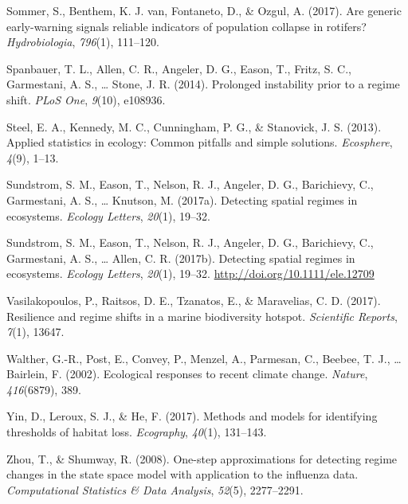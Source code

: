 \documentclass[12pt,twoside,openany]{reedthesis}
\begin{document}
\hypertarget{ref-sommer2017generic}{}
Sommer, S., Benthem, K. J. van, Fontaneto, D., \& Ozgul, A. (2017). Are
generic early-warning signals reliable indicators of population collapse
in rotifers? \emph{Hydrobiologia}, \emph{796}(1), 111--120.

\hypertarget{ref-spanbauer_prolonged_2014}{}
Spanbauer, T. L., Allen, C. R., Angeler, D. G., Eason, T., Fritz, S. C.,
Garmestani, A. S., \ldots{} Stone, J. R. (2014). Prolonged instability
prior to a regime shift. \emph{PLoS One}, \emph{9}(10), e108936.

\hypertarget{ref-steel2013applied}{}
Steel, E. A., Kennedy, M. C., Cunningham, P. G., \& Stanovick, J. S.
(2013). Applied statistics in ecology: Common pitfalls and simple
solutions. \emph{Ecosphere}, \emph{4}(9), 1--13.

\hypertarget{ref-sundstrom_detecting_2017}{}
Sundstrom, S. M., Eason, T., Nelson, R. J., Angeler, D. G., Barichievy,
C., Garmestani, A. S., \ldots{} Knutson, M. (2017a). Detecting spatial
regimes in ecosystems. \emph{Ecology Letters}, \emph{20}(1), 19--32.

\hypertarget{ref-sundstrom2017detecting}{}
Sundstrom, S. M., Eason, T., Nelson, R. J., Angeler, D. G., Barichievy,
C., Garmestani, A. S., \ldots{} Allen, C. R. (2017b). Detecting spatial
regimes in ecosystems. \emph{Ecology Letters}, \emph{20}(1), 19--32.
\url{http://doi.org/10.1111/ele.12709}

\hypertarget{ref-vasilakopoulos2017resilience}{}
Vasilakopoulos, P., Raitsos, D. E., Tzanatos, E., \& Maravelias, C. D.
(2017). Resilience and regime shifts in a marine biodiversity hotspot.
\emph{Scientific Reports}, \emph{7}(1), 13647.

\hypertarget{ref-walther_ecological_2002}{}
Walther, G.-R., Post, E., Convey, P., Menzel, A., Parmesan, C., Beebee,
T. J., \ldots{} Bairlein, F. (2002). Ecological responses to recent
climate change. \emph{Nature}, \emph{416}(6879), 389.

\hypertarget{ref-yin2017methods}{}
Yin, D., Leroux, S. J., \& He, F. (2017). Methods and models for
identifying thresholds of habitat loss. \emph{Ecography}, \emph{40}(1),
131--143.

\hypertarget{ref-zhou2008one}{}
Zhou, T., \& Shumway, R. (2008). One-step approximations for detecting
regime changes in the state space model with application to the
influenza data. \emph{Computational Statistics \& Data Analysis},
\emph{52}(5), 2277--2291.
\end{document}
